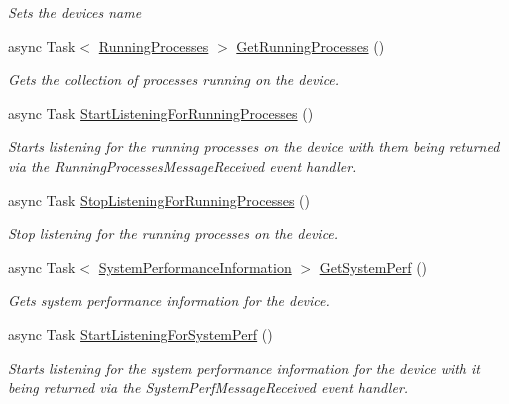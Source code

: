 \begin{DoxyCompactItemize}
\begin{DoxyCompactList}\small\item\em Sets the device\textquotesingle{}s name \end{DoxyCompactList}\item 
async Task$<$ \hyperlink{class_microsoft_1_1_tools_1_1_windows_device_portal_1_1_device_portal_1_1_running_processes}{Running\+Processes} $>$ \hyperlink{class_microsoft_1_1_tools_1_1_windows_device_portal_1_1_device_portal_a243bc3a299a7233eadf055bd6c962bd3}{Get\+Running\+Processes} ()
\begin{DoxyCompactList}\small\item\em Gets the collection of processes running on the device. \end{DoxyCompactList}\item 
async Task \hyperlink{class_microsoft_1_1_tools_1_1_windows_device_portal_1_1_device_portal_a57ac4d787b26087006ab9a70ce75d969}{Start\+Listening\+For\+Running\+Processes} ()
\begin{DoxyCompactList}\small\item\em Starts listening for the running processes on the device with them being returned via the Running\+Processes\+Message\+Received event handler. \end{DoxyCompactList}\item 
async Task \hyperlink{class_microsoft_1_1_tools_1_1_windows_device_portal_1_1_device_portal_af87549e01935c04490d48d35b1771e6b}{Stop\+Listening\+For\+Running\+Processes} ()
\begin{DoxyCompactList}\small\item\em Stop listening for the running processes on the device. \end{DoxyCompactList}\item 
async Task$<$ \hyperlink{class_microsoft_1_1_tools_1_1_windows_device_portal_1_1_device_portal_1_1_system_performance_information}{System\+Performance\+Information} $>$ \hyperlink{class_microsoft_1_1_tools_1_1_windows_device_portal_1_1_device_portal_a76b4d64e4cc58277674fd85534db5d1e}{Get\+System\+Perf} ()
\begin{DoxyCompactList}\small\item\em Gets system performance information for the device. \end{DoxyCompactList}\item 
async Task \hyperlink{class_microsoft_1_1_tools_1_1_windows_device_portal_1_1_device_portal_a6b35ea027c8285cbf04a6f86cae852e5}{Start\+Listening\+For\+System\+Perf} ()
\begin{DoxyCompactList}\small\item\em Starts listening for the system performance information for the device with it being returned via the System\+Perf\+Message\+Received event handler. \end{DoxyCompactList}\item 

\end{DoxyCompactItemize}
